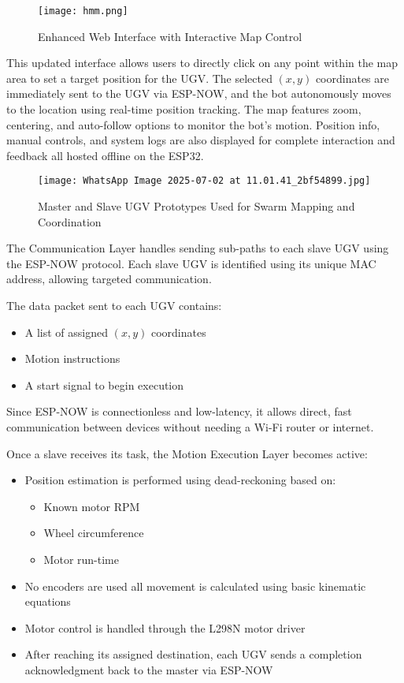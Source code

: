 \documentclass[a4paper,12pt]{report}
\begin{document}
\begin{figure}[H]
    \centering
    \texttt{[image: hmm.png]}
    \caption{Enhanced Web Interface with Interactive Map Control}
\end{figure}

This updated interface allows users to directly click on any point within the map area to set a target position for the UGV.  
The selected $(x, y)$ coordinates are immediately sent to the UGV via ESP-NOW, and the bot autonomously moves to the location using real-time position tracking.  
The map features zoom, centering, and auto-follow options to monitor the bot’s motion.  
Position info, manual controls, and system logs are also displayed for complete interaction and feedback all hosted offline on the ESP32.

\begin{figure}[H]
    \centering
    \texttt{[image: WhatsApp Image 2025-07-02 at 11.01.41\_2bf54899.jpg]} %
    \caption{Master and Slave UGV Prototypes Used for Swarm Mapping and Coordination}
\end{figure}

The Communication Layer handles sending sub-paths to each slave UGV using the ESP-NOW protocol.  
Each slave UGV is identified using its unique MAC address, allowing targeted communication.

The data packet sent to each UGV contains:
\begin{itemize}
    \item A list of assigned $(x, y)$ coordinates
    \item Motion instructions
    \item A start signal to begin execution
\end{itemize}

Since ESP-NOW is connectionless and low-latency, it allows direct, fast communication between devices without needing a Wi-Fi router or internet.

Once a slave receives its task, the Motion Execution Layer becomes active:
\begin{itemize}
    \item Position estimation is performed using dead-reckoning based on:
    \begin{itemize}
        \item Known motor RPM
        \item Wheel circumference
        \item Motor run-time
    \end{itemize}
    \item No encoders are used all movement is calculated using basic kinematic equations
    \item Motor control is handled through the L298N motor driver
    \item After reaching its assigned destination, each UGV sends a completion acknowledgment back to the master via ESP-NOW
\end{itemize}
\end{document}
